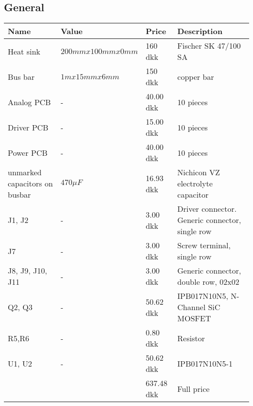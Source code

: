 \subsection{General}
\begin{table}[H]
\centering
\small
\begin{tabular}{|p{4cm} p{1.5cm} p{2cm} p{6cm}|} \hline
\textbf{Name}    & \textbf{Value} & \textbf{Price}
& \textbf{Description}                            \\ \hline
Heat sink            & $200mm x 100mm x 0mm $   & 160 dkk & Fischer SK 47/100 SA                                            \\
Bus bar         & $1m x 15mm x 6mm $       & 150 dkk & copper bar                                            \\
Analog PCB               & -              & 40.00 dkk & 10 pieces                                           \\
Driver PCB               & -       & 15.00 dkk & 10 pieces                                            \\
Power PCB               & -              & 40.00 dkk & 10 pieces                                            \\
unmarked capacitors on busbar     & $470 \mu F$ & 16.93 dkk & Nichicon VZ electrolyte capacitor        \\
J1, J2           &  -             & 3.00 dkk & Driver connector. Generic connector, single row \\
J7               & -              & 3.00 dkk  & Screw terminal, single row                      \\
J8, J9, J10, J11 & -              & 3.00 dkk
& Generic connector, double row, 02x02            \\
Q2, Q3           & -              & 50.62 dkk
& IPB017N10N5, N-Channel SiC MOSFET               \\
R5,R6            & -              & 0.80 dkk
& Resistor                                        \\
U1, U2           & -              & 50.62 dkk
& IPB017N10N5-1 \\ \hline
&& 637.48 dkk & Full price \\ \hline
\end{tabular}
\end{table}